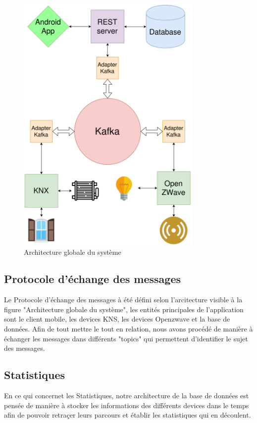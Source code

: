 \begin{figure}
    \begin{center}
        \includegraphics[width=0.8\textwidth]{img/general.png}
    \end{center}
    \caption{Architecture globale du système}
    \label{shema_general}
\end{figure}


\subsection{Protocole d'échange des messages}
Le Protocole d'échange des messages à été défini selon l'arcitecture visible à la figure "Architecture globale du système", les entités principales de l'application sont le client mobile, les devices KNS, les devices Openzwave et la base de données. Afin de tout mettre le tout en relation, nous avons procédé de manière à échanger les messages dans différents "topics" qui permettent d'identifier le sujet des messages.

\subsection{Statistiques}
En ce qui concernet les Statistiques, notre architecture de la base de données est pensée de manière à stocker les informations des différents devices dans le temps afin de pouvoir retraçer leurs parcours et établir les statistiques qui en découlent.